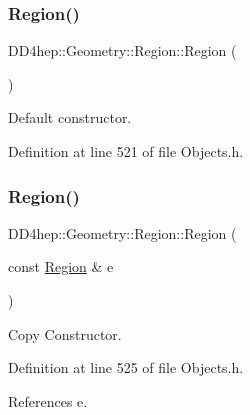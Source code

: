 \subsubsection{\texorpdfstring{Region()}{Region()}\hspace{0.1cm}{\footnotesize\ttfamily [1/5]}}
{\footnotesize\ttfamily D\+D4hep\+::\+Geometry\+::\+Region\+::\+Region (\begin{DoxyParamCaption}{ }\end{DoxyParamCaption})\hspace{0.3cm}{\ttfamily [inline]}}



Default constructor. 



Definition at line 521 of file Objects.\+h.

\hypertarget{class_d_d4hep_1_1_geometry_1_1_region_a81c2f0b5d7cd042c22af48acd27bf95c}{}\label{class_d_d4hep_1_1_geometry_1_1_region_a81c2f0b5d7cd042c22af48acd27bf95c} 
\subsubsection{\texorpdfstring{Region()}{Region()}\hspace{0.1cm}{\footnotesize\ttfamily [2/5]}}
{\footnotesize\ttfamily D\+D4hep\+::\+Geometry\+::\+Region\+::\+Region (\begin{DoxyParamCaption}\item[{const \hyperlink{class_d_d4hep_1_1_geometry_1_1_region}{Region} \&}]{e }\end{DoxyParamCaption})\hspace{0.3cm}{\ttfamily [inline]}}



Copy Constructor. 



Definition at line 525 of file Objects.\+h.



References e.

\hypertarget{class_d_d4hep_1_1_geometry_1_1_region_a965bf209a05655ee147c4adcdddfe20f}{}\label{class_d_d4hep_1_1_geometry_1_1_region_a965bf209a05655ee147c4adcdddfe20f} 
